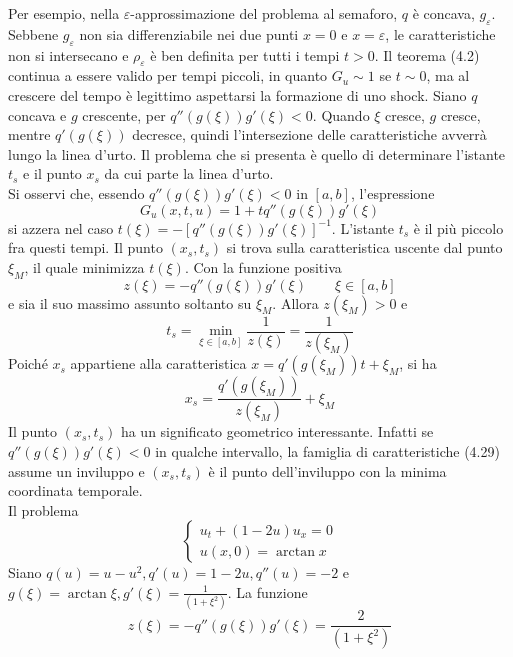 \documentclass[a4paper,12pt, draft]{article}
\theoremstyle{break}
\let\epsilon\varepsilon
\numberwithin{equation}{section}
\begin{document}
Per esempio, nella \(\epsilon\)-approssimazione del problema al semaforo, \(q\) è concava, \(g_{\epsilon}\). Sebbene \(g_{\epsilon}\) non sia differenziabile nei due punti \(x = 0\) e \(x = \epsilon\), le caratteristiche non si intersecano e \(\rho_{\epsilon}\) è ben definita per tutti i tempi \(t > 0\). Il teorema (4.2) continua a essere valido per tempi piccoli, in quanto \(G_u \sim 1\) se \(t \sim 0\), ma al crescere del tempo è legittimo aspettarsi la formazione di uno shock. Siano \(q\) concava e \(g\) crescente, per \(q''(g(\xi))g'(\xi) < 0\). Quando \(\xi\) cresce, \(g\) cresce, mentre \(q'(g(\xi))\) decresce, quindi l'intersezione delle caratteristiche avverrà lungo la linea d'urto. Il problema che si presenta è quello di determinare l'istante \(t_s\) e il punto \(x_s\) da cui parte la linea d'urto. \\
Si osservi che, essendo \(q''(g(\xi))g'(\xi) < 0\) in \([a,b]\), l'espressione 
\[
  G_u(x,t,u) = 1 + tq''(g(\xi))g'(\xi)  
\] 
si azzera nel caso \(t(\xi) = -[q''(g(\xi))g'(\xi)]^{-1}\). L'istante \(t_s\) è il più piccolo fra questi tempi. Il punto \((x_s, t_s)\) si trova sulla caratteristica uscente dal punto \(\xi_M\), il quale minimizza \(t(\xi)\). 
Con la funzione positiva
\[
  z(\xi) = -q''(g(\xi))g'(\xi) \qquad  \xi \in [a,b]
\]
e sia il suo massimo assunto soltanto su \(\xi_M\). Allora \(z(\xi_M) > 0\) e 
\begin{equation}
  t_s = \min_{\xi \in [a,b]} \frac{1}{z(\xi)} = \frac{1}{z(\xi_M)}
\end{equation}
Poiché \(x_s\) appartiene alla caratteristica \(x = q'(g(\xi_M))t + \xi_M\), si ha 
\begin{equation}
  x_s = \frac{q'(g(\xi_M))}{z(\xi_M)} + \xi_M
\end{equation}
Il punto \((x_s, t_s)\) ha un significato geometrico interessante. Infatti se \(q''(g(\xi))g'(\xi) < 0\) in qualche intervallo, la famiglia di caratteristiche (4.29) assume un inviluppo e \((x_s, t_s)\) è il punto dell'inviluppo con la minima coordinata temporale. \\
Il problema 
\begin{equation}
  \begin{cases}
    u_t + (1-2u)u_x = 0 \\
    u(x, 0) = \arctan x
  \end{cases}
\end{equation}
Siano \(q(u) = u-u^2, q'(u) = 1- 2u, q''(u) = -2\) e \(g(\xi) = \arctan \xi, g' (\xi) = \frac{1}{(1+\xi^2)}\). La funzione 
\[
  z(\xi) = -q''(g(\xi))g'(\xi) = \frac{2}{(1+\xi^2)}
\]
\end{document}
